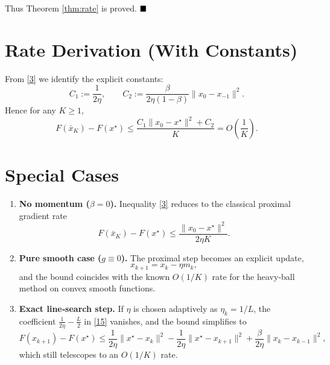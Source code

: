 \documentclass[12pt]{article}
\theoremstyle{definition}
\begin{document}
Thus Theorem \ref{thm:rate} is proved. $\hfill\blacksquare$

\section*{Rate Derivation (With Constants)}
From \eqref{3} we identify the explicit constants:
\[
C_{1}:=\frac{1}{2\eta},\qquad
C_{2}:=\frac{\beta}{2\eta(1-\beta)}\|x_{0}-x_{-1}\|^{2}.
\]
Hence for any $K\ge1$,
\[
F(\bar{x}_{K})-F(x^{\star})\le \frac{C_{1}\|x_{0}-x^{\star}\|^{2}+C_{2}}{K}=O\!\left(\frac{1}{K}\right).
\]

\section*{Special Cases}
\begin{enumerate}[label=\alph*.]
\item \textbf{No momentum ($\beta=0$).} Inequality \eqref{3} reduces to the classical proximal gradient rate
\[
F(\bar{x}_{K})-F(x^{\star})\le \frac{\|x_{0}-x^{\star}\|^{2}}{2\eta K}.
\]

\item \textbf{Pure smooth case ($g\equiv0$).} The proximal step becomes an explicit update,
\[
x_{k+1}=x_{k}-\eta m_{k},
\]
and the bound coincides with the known $O(1/K)$ rate for the heavy‑ball method on convex smooth functions.

\item \textbf{Exact line‑search step.} If $\eta$ is chosen adaptively as $\eta_{k}=1/L$, the coefficient $\frac{1}{2\eta}-\frac{L}{2}$ in \eqref{15} vanishes, and the bound simplifies to
\[
F(x_{k+1})-F(x^{\star})\le
\frac{1}{2\eta}\bigl\|x^{\star}-x_{k}\bigr\|^{2}
-\frac{1}{2\eta}\bigl\|x^{\star}-x_{k+1}\bigr\|^{2}
+\frac{\beta}{2\eta}\|x_{k}-x_{k-1}\|^{2},
\]
which still telescopes to an $O(1/K)$ rate.
\end{enumerate}
\end{document}
